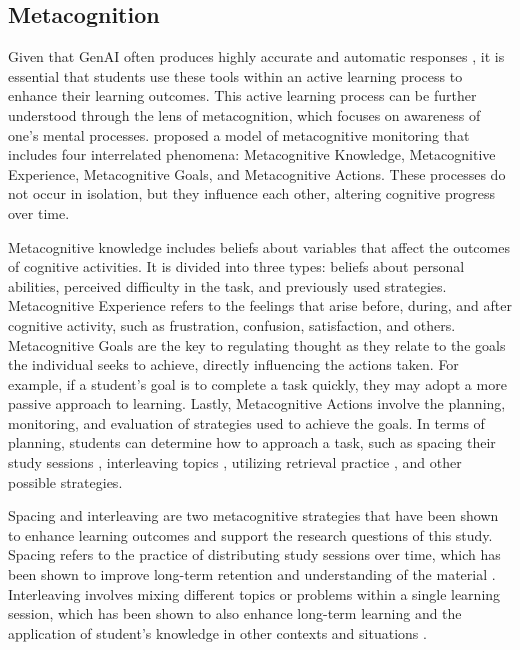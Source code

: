 \documentclass[sn-apa]{sn-jnl} %
\begin{document}
\subsection{Metacognition}

Given that GenAI often produces highly accurate and automatic responses
\citep{Puryear22}, it is essential that students use these tools within an
active learning process to enhance their learning outcomes. This active
learning process can be further understood through the lens of metacognition,
which focuses on awareness of one's mental processes. \cite{flavell79}
proposed a model of metacognitive monitoring that includes four interrelated
phenomena: Metacognitive Knowledge, Metacognitive Experience, Metacognitive
Goals, and Metacognitive Actions. These processes do not occur in isolation, but
they influence each other, altering cognitive progress over time.

Metacognitive knowledge includes beliefs about variables that affect the
outcomes of cognitive activities. It is divided into three types: beliefs about
personal abilities, perceived difficulty in the task, and previously used
strategies. Metacognitive Experience refers to the feelings that arise before,
during, and after cognitive activity, such as frustration, confusion,
satisfaction, and others. Metacognitive Goals are the key to regulating thought
as they relate to the goals the individual seeks to achieve, directly
influencing the actions taken. For example, if a student’s goal is to complete
a task quickly, they may adopt a more passive approach to learning. Lastly,
Metacognitive Actions involve the planning, monitoring, and evaluation of
strategies used to achieve the goals. In terms of planning, students can
determine how to approach a task, such as spacing their study sessions
\citep{Carvalho20}, interleaving topics \citep{Rivers21}, utilizing
retrieval practice \citep{larsen18}, and other possible strategies.

Spacing and interleaving are two metacognitive strategies that have been shown
to enhance learning outcomes and support the research questions of this study.
Spacing refers to the practice of distributing study sessions over time, which
has been shown to improve long-term retention and understanding of the material
\citep{Carvalho20}. Interleaving involves mixing different topics or problems
within a single learning session, which has been shown to also enhance long-term
learning and the application of student's knowledge in other contexts and
situations \citep{Rivers21} .
\end{document}
